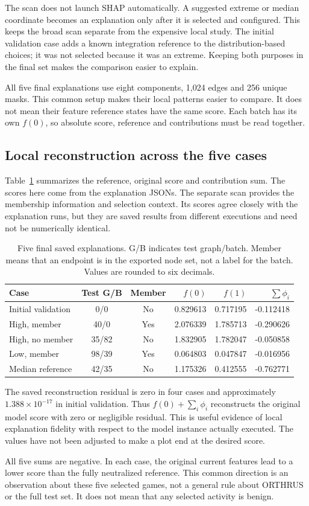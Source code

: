 \documentclass[11pt,a4paper]{article}
\newcommand{\MaxResidual}{1.388\times 10^{-17}}
\newcommand{\CaseRowsEN}{
Initial validation & 0/0 & No & 0.829613 & 0.717195 & -0.112418 \\
High, member & 40/0 & Yes & 2.076339 & 1.785713 & -0.290626 \\
High, no member & 35/82 & No & 1.832905 & 1.782047 & -0.050858 \\
Low, member & 98/39 & Yes & 0.064803 & 0.047847 & -0.016956 \\
Median reference & 42/35 & No & 1.175326 & 0.412555 & -0.762771 \\}
\begin{document}
The scan does not launch SHAP automatically. A suggested extreme or median
coordinate becomes an explanation only after it is selected and configured.
This keeps the broad scan separate from the expensive local study. The initial
validation case adds a known integration reference to the distribution-based
choices; it was not selected because it was an extreme. Keeping both purposes
in the final set makes the comparison easier to explain.

All five final explanations use eight components, 1,024 edges and 256 unique
masks. This common setup makes their local patterns easier to compare. It does
not mean their feature reference states have the same score. Each batch has its
own $f(0)$, so absolute score, reference and contributions must be read together.

\subsection{Local reconstruction across the five cases}
Table~\ref{tab:cases} summarizes the reference, original score and contribution
sum. The scores here come from the explanation JSONs. The separate scan provides
the membership information and selection context. Its scores agree closely
with the explanation runs, but they are saved results from different executions
and need not be numerically identical.

\begin{table}[htbp]
\centering\small
\setlength{\tabcolsep}{4pt}
\begin{tabular}{@{}lccrrr@{}}
\toprule
Case & Test G/B & Member & $f(0)$ & $f(1)$ & $\sum\phi_i$\\
\midrule
\CaseRowsEN
\bottomrule
\end{tabular}
\caption{Five final saved explanations. G/B indicates test graph/batch. Member
means that an endpoint is in the exported node set, not a label for the batch.
Values are rounded to six decimals.}
\label{tab:cases}
\end{table}

The saved reconstruction residual is zero in four cases and approximately
$\MaxResidual$ in initial validation. Thus $f(0)+\sum_i\phi_i$ reconstructs
the original model score with zero or negligible residual. This is useful
evidence of local explanation fidelity with respect to the model instance
actually executed. The values have not been adjusted to make a plot end at
the desired score.

All five sums are negative. In each case, the original current features lead
to a lower score than the fully neutralized reference. This common direction
is an observation about these five selected games, not a general rule about
ORTHRUS or the full test set. It does not mean that any selected activity is
benign.
\end{document}

